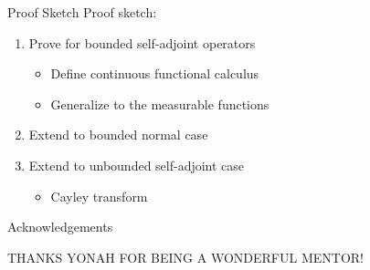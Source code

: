 \documentclass{beamer}
\theoremstyle{plain}
\theoremstyle{definition}
\begin{document}
\begin{frame}{Proof Sketch}
    Proof sketch:
    \begin{enumerate}
        \item Prove for bounded self-adjoint operators
            \begin{itemize}
                \item Define continuous functional calculus
                \item Generalize to the measurable functions
            \end{itemize}
        \item Extend to bounded normal case
        \item Extend to unbounded self-adjoint case
            \begin{itemize}
                \item Cayley transform
            \end{itemize}
    \end{enumerate}
\end{frame}

\begin{frame}{Acknowledgements}
    \begin{center}
        THANKS YONAH FOR BEING A WONDERFUL MENTOR!
    \end{center}
\end{frame}
\end{document}
